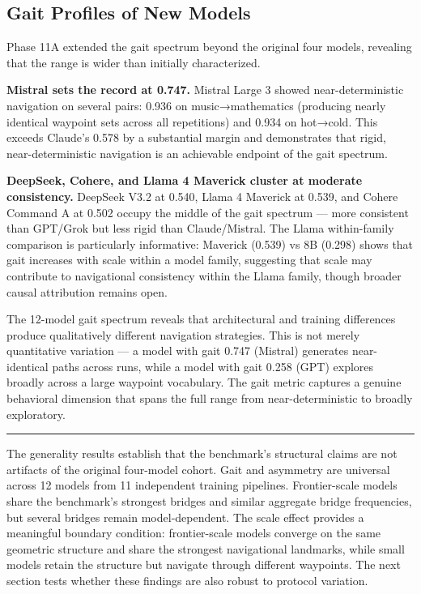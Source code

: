 \subsection{Gait Profiles of New Models}\label{gait-profiles-of-new-models}

Phase 11A extended the gait spectrum beyond the original four models, revealing that the range is wider than initially characterized.

\textbf{Mistral sets the record at 0.747.} Mistral Large 3 showed near-deterministic navigation on several pairs: 0.936 on music→mathematics (producing nearly identical waypoint sets across all repetitions) and 0.934 on hot→cold. This exceeds Claude's 0.578 by a substantial margin and demonstrates that rigid, near-deterministic navigation is an achievable endpoint of the gait spectrum.

\textbf{DeepSeek, Cohere, and Llama 4 Maverick cluster at moderate consistency.} DeepSeek V3.2 at 0.540, Llama 4 Maverick at 0.539, and Cohere Command A at 0.502 occupy the middle of the gait spectrum --- more consistent than GPT/Grok but less rigid than Claude/Mistral. The Llama within-family comparison is particularly informative: Maverick (0.539) vs 8B (0.298) shows that gait increases with scale within a model family, suggesting that scale may contribute to navigational consistency within the Llama family, though broader causal attribution remains open.

The 12-model gait spectrum reveals that architectural and training differences produce qualitatively different navigation strategies. This is not merely quantitative variation --- a model with gait 0.747 (Mistral) generates near-identical paths across runs, while a model with gait 0.258 (GPT) explores broadly across a large waypoint vocabulary. The gait metric captures a genuine behavioral dimension that spans the full range from near-deterministic to broadly exploratory.

\begin{center}\rule{0.5\linewidth}{0.5pt}\end{center}

The generality results establish that the benchmark's structural claims are not artifacts of the original four-model cohort. Gait and asymmetry are universal across 12 models from 11 independent training pipelines. Frontier-scale models share the benchmark's strongest bridges and similar aggregate bridge frequencies, but several bridges remain model-dependent. The scale effect provides a meaningful boundary condition: frontier-scale models converge on the same geometric structure and share the strongest navigational landmarks, while small models retain the structure but navigate through different waypoints. The next section tests whether these findings are also robust to protocol variation.
